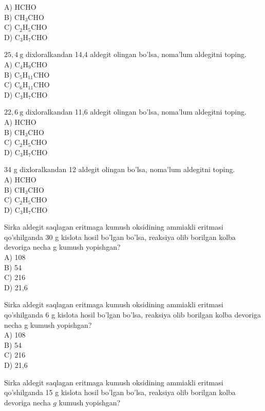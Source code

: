 A) HCHO\\
B) $\mathrm{CH}_{3} \mathrm{CHO}$\\
C) $\mathrm{C}_{2} \mathrm{H}_{5} \mathrm{CHO}$\\
D) $\mathrm{C}_{3} \mathrm{H}_{7} \mathrm{CHO}$
  \item $25,4 \mathrm{~g}$ dixloralkandan 14,4 aldegit olingan bo'lsa, noma'lum aldegitni toping.\\
A) $\mathrm{C}_{4} \mathrm{H}_{9} \mathrm{CHO}$\\
B) $\mathrm{C}_{5} \mathrm{H}_{11} \mathrm{CHO}$\\
C) $\mathrm{C}_{6} \mathrm{H}_{11} \mathrm{CHO}$\\
D) $\mathrm{C}_{3} \mathrm{H}_{7} \mathrm{CHO}$
  \item $22,6 \mathrm{~g}$ dixloralkandan 11,6 aldegit olingan bo'lsa, noma'lum aldegitni toping.\\
A) HCHO\\
B) $\mathrm{CH}_{3} \mathrm{CHO}$\\
C) $\mathrm{C}_{2} \mathrm{H}_{5} \mathrm{CHO}$\\
D) $\mathrm{C}_{3} \mathrm{H}_{7} \mathrm{CHO}$
  \item 34 g dixloralkandan 12 aldegit olingan bo'lsa, noma'lum aldegitni toping.\\
A) HCHO\\
B) $\mathrm{CH}_{3} \mathrm{CHO}$\\
C) $\mathrm{C}_{2} \mathrm{H}_{5} \mathrm{CHO}$\\
D) $\mathrm{C}_{3} \mathrm{H}_{7} \mathrm{CHO}$
  \item Sirka aldegit saqlagan eritmaga kumush oksidining ammiakli eritmasi qo'shilganda 30 g kislota hosil bo'lgan bo'lsa, reaksiya olib borilgan kolba devoriga necha g kumush yopishgan?\\
A) 108\\
B) 54\\
C) 216\\
D) 21,6
  \item Sirka aldegit saqlagan eritmaga kumush oksidining ammiakli eritmasi qo'shilganda 6 g kislota hosil bo'lgan bo'lsa, reaksiya olib borilgan kolba devoriga necha g kumush yopishgan?\\
A) 108\\
B) 54\\
C) 216\\
D) 21,6
  \item Sirka aldegit saqlagan eritmaga kumush oksidining ammiakli eritmasi qo'shilganda 15 g kislota hosil bo'lgan bo'lsa, reaksiya olib borilgan kolba devoriga necha $g$ kumush yopishgan?\\
